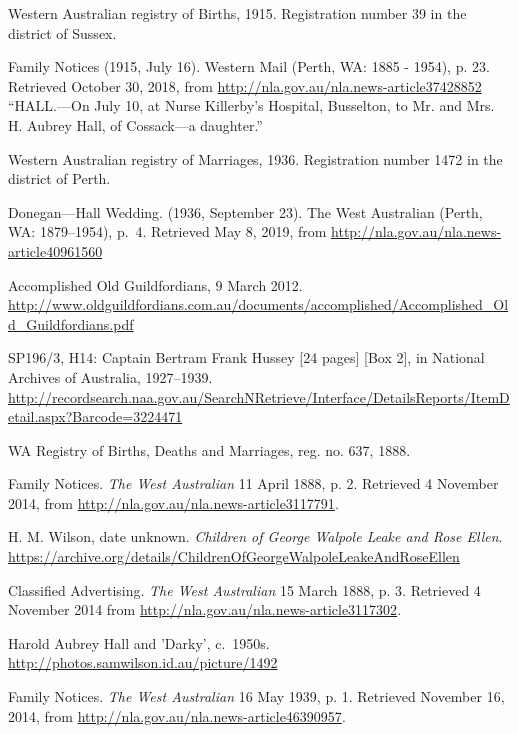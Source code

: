 \begin{thebibliography}{999}
	Western Australian registry of Births, 1915. Registration number 39 in the district of Sussex.

	Family Notices (1915, July 16). Western Mail (Perth, WA: 1885 - 1954), p. 23. Retrieved October 30, 2018, from \url{http://nla.gov.au/nla.news-article37428852}
	``HALL.---On July 10, at Nurse Killerby's Hospital, Busselton, to Mr. and Mrs. H. Aubrey Hall, of Cossack---a daughter.''

	Western Australian registry of Marriages, 1936. Registration number 1472 in the district of Perth.

	Donegan---Hall Wedding. (1936, September 23). The West Australian (Perth, WA: 1879--1954), p.\ 4.
	Retrieved May 8, 2019, from \url{http://nla.gov.au/nla.news-article40961560}

	Accomplished Old Guildfordians, 9 March 2012.
	\url{http://www.oldguildfordians.com.au/documents/accomplished/Accomplished_Old_Guildfordians.pdf}

	SP196/3, H14: Captain Bertram Frank Hussey [24 pages] [Box 2], in National Archives of Australia, 1927--1939.
	\url{http://recordsearch.naa.gov.au/SearchNRetrieve/Interface/DetailsReports/ItemDetail.aspx?Barcode=3224471}

	WA Registry of Births, Deaths and Marriages, reg. no. 637, 1888.

	Family Notices. \emph{The West Australian} 11 April 1888, p. 2. Retrieved 4 November 2014,
	from \url{http://nla.gov.au/nla.news-article3117791}.

	H. M. Wilson, date unknown. \emph{Children of George Walpole Leake and Rose Ellen}.
	\url{https://archive.org/details/ChildrenOfGeorgeWalpoleLeakeAndRoseEllen}

	Classified Advertising. \emph{The West Australian} 15 March 1888, p. 3.
	Retrieved 4 November 2014 from \url{http://nla.gov.au/nla.news-article3117302}.

	Harold Aubrey Hall and 'Darky', c.\ 1950s.
	\url{http://photos.samwilson.id.au/picture/1492}

	Family Notices. \emph{The West Australian} 16 May 1939, p. 1. Retrieved November 16, 2014, from \url{http://nla.gov.au/nla.news-article46390957}.


\end{thebibliography}
